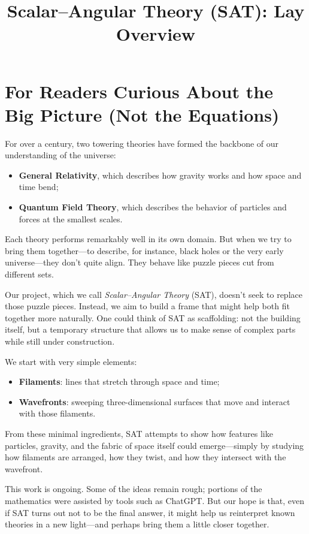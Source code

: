 \documentclass[12pt]{article}
\title{Scalar--Angular Theory (SAT): Lay Overview}
\author{}
\date{}
\begin{document}
\maketitle

\section*{For Readers Curious About the Big Picture (Not the Equations)}

For over a century, two towering theories have formed the backbone of our understanding of the universe:
\begin{itemize}
  \item \textbf{General Relativity}, which describes how gravity works and how space and time bend;
  \item \textbf{Quantum Field Theory}, which describes the behavior of particles and forces at the smallest scales.
\end{itemize}

Each theory performs remarkably well in its own domain. But when we try to bring them together---to describe, for instance, black holes or the very early universe---they don’t quite align. They behave like puzzle pieces cut from different sets.

Our project, which we call \textit{Scalar--Angular Theory} (SAT), doesn’t seek to replace those puzzle pieces. Instead, we aim to build a frame that might help both fit together more naturally. One could think of SAT as scaffolding: not the building itself, but a temporary structure that allows us to make sense of complex parts while still under construction.

We start with very simple elements:
\begin{itemize}
  \item \textbf{Filaments}: lines that stretch through space and time;
  \item \textbf{Wavefronts}: sweeping three-dimensional surfaces that move and interact with those filaments.
\end{itemize}

From these minimal ingredients, SAT attempts to show how features like particles, gravity, and the fabric of space itself could emerge---simply by studying how filaments are arranged, how they twist, and how they intersect with the wavefront.

This work is ongoing. Some of the ideas remain rough; portions of the mathematics were assisted by tools such as ChatGPT. But our hope is that, even if SAT turns out not to be the final answer, it might help us reinterpret known theories in a new light---and perhaps bring them a little closer together.
\end{document}
